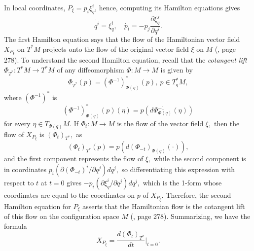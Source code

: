 \documentclass[12pt, letterpaper, reqno]{amsart}
\theoremstyle{definition}
\theoremstyle{plain}
\theoremstyle{remark}
\begin{document}
In local coordinates, $ P_\xi = p_i \xi_q^i $, hence, computing its Hamilton equations gives
$$ \dot{q^i} = \xi_q^i,\quad \dot{p_i} = -p_j \frac{\partial \xi_q^j}{\partial q^i}.  $$ 
The first Hamilton equation says that the flow of the Hamiltonian vector field $ X_{P_\xi} $ on $ T^*M $ projects onto the flow of the original vector field $ \xi $ on $ M $ (\cite{montgomery2002tour}, page 278). To understand the second Hamilton equation, recall that the \textit{cotangent lift} $ \Phi_{T^*}: T^*M \rightarrow T^*M $ of any diffeomorphism $ \Phi : M \rightarrow M $ is given by 
$$ \Phi_{T^*}(p) = (\Phi^{-1})^*_{\Phi(q)}(p),\ p\in T^*_qM,$$ 
where $ (\Phi^{-1})^* $ is 
$$ (\Phi^{-1})^*_{\Phi(q)}(p)(\eta) = p \left( d\Phi^{-1}_{\Phi(q)}(\eta) \right) $$ 
for every $ \eta\in T_{\Phi(q)}M. $ If $ \Phi_t: M \rightarrow M $ is the flow of the vector field $ \xi, $ then the flow of $ X_{P_\xi} $ is $ (\Phi_t)_{T^*}, $ as
$$ (\Phi_t)_{T^*}(p) = p \left( d(\Phi_{-t})_{\Phi(q)}(\cdot) \right), $$ 
and the first component represents the flow of $ \xi, $ while the second component is in coordinates $ p_i (\partial (\Phi_{-t})^i/\partial q^j)dq^j, $ so differentiating this expression with respect to $ t $ at $ t=0 $ gives $ -p_i (\partial \xi_q^i/\partial q^j)dq^j, $ which is the 1-form whose coordinates are equal to the coordinates on $ p $ of $ X_{P_\xi} $. Therefore, the second Hamilton equation for $ P_\xi $ asserts that the Hamiltonian flow is the cotangent lift of this flow on the configuration space $ M $ (\cite{montgomery2002tour}, page 278). Summarizing, we have the formula 
$$ X_{P_\xi} = \frac{d(\Phi_t)_{T^*}}{dt} \Big|_{t=0}.  $$ 
\end{document}
